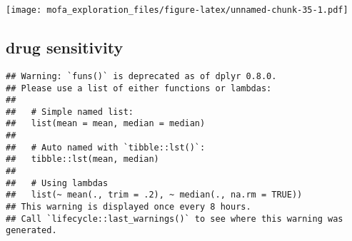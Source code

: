 \documentclass[
]{article}
\newenvironment{Shaded}{\begin{snugshade}}{\end{snugshade}}
\newcommand{\KeywordTok}[1]{\textcolor[rgb]{0.13,0.29,0.53}{\textbf{#1}}}
\newcommand{\NormalTok}[1]{#1}
\newcommand{\OperatorTok}[1]{\textcolor[rgb]{0.81,0.36,0.00}{\textbf{#1}}}
\newcommand{\StringTok}[1]{\textcolor[rgb]{0.31,0.60,0.02}{#1}}
\begin{document}
\texttt{[image: mofa\_exploration\_files/figure-latex/unnamed-chunk-35-1.pdf]}

\hypertarget{drug-sensitivity}{%
\subsection{drug sensitivity}\label{drug-sensitivity}}

\begin{Shaded}
\end{Shaded}

\begin{verbatim}
## Warning: `funs()` is deprecated as of dplyr 0.8.0.
## Please use a list of either functions or lambdas: 
## 
##   # Simple named list: 
##   list(mean = mean, median = median)
## 
##   # Auto named with `tibble::lst()`: 
##   tibble::lst(mean, median)
## 
##   # Using lambdas
##   list(~ mean(., trim = .2), ~ median(., na.rm = TRUE))
## This warning is displayed once every 8 hours.
## Call `lifecycle::last_warnings()` to see where this warning was generated.
\end{verbatim}
\end{document}
